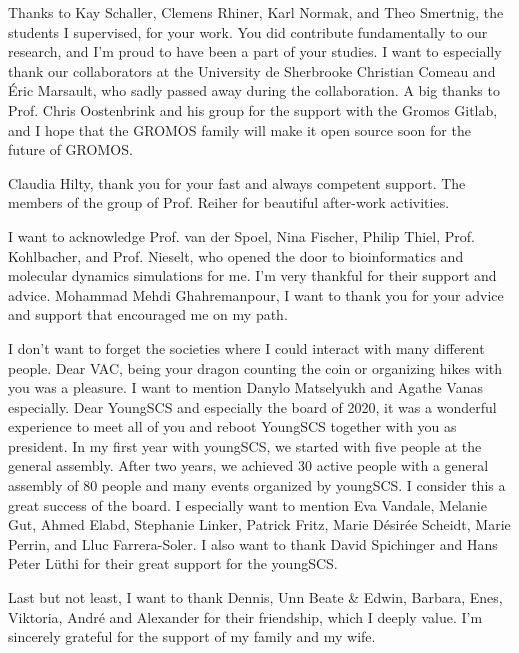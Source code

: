 Thanks to Kay Schaller, Clemens Rhiner, Karl Normak, and Theo Smertnig, the students I supervised, for your work. You did contribute fundamentally to our research, and I'm proud to have been a part of your studies.
I want to especially thank our collaborators at the University de Sherbrooke Christian Comeau and {\' E}ric Marsault, who sadly passed away during the collaboration. A big thanks to Prof. Chris Oostenbrink and his group for the support with the Gromos Gitlab, and I hope that the GROMOS family will make it open source soon for the future of GROMOS.


Claudia Hilty, thank you for your fast and always competent support. 
The members of the group of Prof. Reiher for beautiful after-work activities.

I want to acknowledge Prof. van der Spoel, Nina Fischer, Philip Thiel, Prof. Kohlbacher, and Prof. Nieselt, who opened the door to bioinformatics and molecular dynamics simulations for me. I'm very thankful for their support and advice.  
Mohammad Mehdi Ghahremanpour, I want to thank you for your advice and support that encouraged me on my path.

I don't want to forget the societies where I could interact with many different people.
Dear VAC, being your dragon counting the coin or organizing hikes with you was a pleasure. I want to mention Danylo Matselyukh and Agathe Vanas especially. 
Dear YoungSCS and especially the board of 2020, it was a wonderful experience to meet all of you and reboot YoungSCS together with you as president. In my first year with youngSCS, we started with five people at the general assembly. After two years, we achieved 30 active people with a general assembly of 80 people and many events organized by youngSCS. I consider this a great success of the board. I especially want to mention Eva Vandale, Melanie Gut, Ahmed Elabd, Stephanie Linker, Patrick Fritz, Marie D{\'e}sir{\'e}e Scheidt, Marie Perrin, and Lluc Farrera-Soler. I also want to thank David Spichinger and Hans Peter L\"uthi for their great support for the youngSCS.

Last but not least, I want to thank Dennis, Unn Beate \& Edwin, Barbara, Enes, Viktoria, Andr{\'e} and Alexander for their friendship, which I deeply value.
I'm sincerely grateful for the support of my family and my wife.

\begin{center}
    \begin{minipage}[t]{.5\linewidth}
    \end{minipage}
\end{center}
